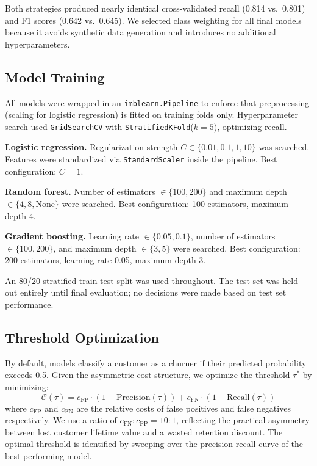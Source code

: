 \documentclass{article}
\begin{document}
Both strategies produced nearly identical cross-validated recall (0.814 vs.\ 0.801)
and F1 scores (0.642 vs.\ 0.645). We selected class weighting for all final models
because it avoids synthetic data generation and introduces no additional hyperparameters.

\subsection{Model Training}

All models were wrapped in an \texttt{imblearn.Pipeline} to enforce that preprocessing
(scaling for logistic regression) is fitted on training folds only. Hyperparameter
search used \texttt{GridSearchCV} with \texttt{StratifiedKFold}($k=5$), optimizing recall.

\textbf{Logistic regression.} Regularization strength $C \in \{0.01, 0.1, 1, 10\}$
was searched. Features were standardized via \texttt{StandardScaler} inside the pipeline.
Best configuration: $C = 1$.

\textbf{Random forest.} Number of estimators $\in \{100, 200\}$ and maximum depth
$\in \{4, 8, \text{None}\}$ were searched. Best configuration: 100 estimators,
maximum depth 4.

\textbf{Gradient boosting.} Learning rate $\in \{0.05, 0.1\}$, number of estimators
$\in \{100, 200\}$, and maximum depth $\in \{3, 5\}$ were searched. Best configuration:
200 estimators, learning rate 0.05, maximum depth 3.

An 80/20 stratified train-test split was used throughout. The test set was held out
entirely until final evaluation; no decisions were made based on test set performance.

\subsection{Threshold Optimization}

By default, models classify a customer as a churner if their predicted probability
exceeds 0.5. Given the asymmetric cost structure, we optimize the threshold $\tau^*$ by
minimizing:
\begin{equation}
  \mathcal{C}(\tau) = c_{\text{FP}} \cdot (1 - \text{Precision}(\tau))
                    + c_{\text{FN}} \cdot (1 - \text{Recall}(\tau))
\end{equation}
where $c_{\text{FP}}$ and $c_{\text{FN}}$ are the relative costs of false positives and
false negatives respectively. We use a ratio of $c_{\text{FN}} : c_{\text{FP}} = 10:1$,
reflecting the practical asymmetry between lost customer lifetime value and a wasted
retention discount. The optimal threshold is identified by sweeping over the precision-recall
curve of the best-performing model.
\end{document}
